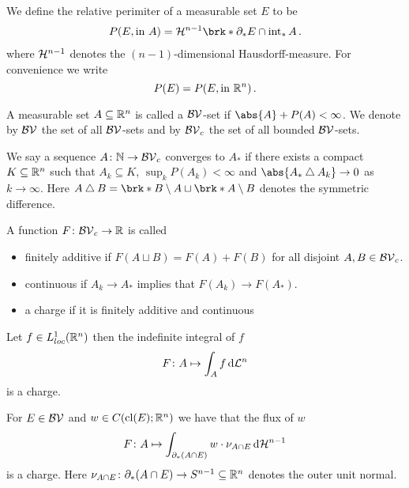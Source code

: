 \begin{frame}
	\begin{definition}
	We define the relative perimiter of a measurable set $E$ to be 
	\begin{align*}
		P(E,\text{in }A)=\cH^{n-1}\brk*{\partial_*E\cap \interiour_*A}\,.
	\end{align*}
	where $\mathcal{H}^{n-1}$ denotes the $(n-1)$-dimensional Hausdorff-measure. For convenience we write $$P(E)=P(E,\text{in }\mathbb{R}^n)\,.$$
	\end{definition}
\end{frame}

\begin{frame}
	\begin{definition}[$\BV$-sets]
	A measurable set $A\subseteq\mathbb{R}^n$ is called a $\BV$-set if $ \abs{A}+P(A)<\infty$. We denote by $\BV$ the set of all $\BV$-sets and by $\BV_c$ the set of all bounded $\BV$-sets.
	\end{definition}
	\begin{definition}[Topology on $\BV_c$]
	We say a sequence $A\colon\mathbb{N}\to \mathcal{BV}_c$ converges to $A_*$ if there exists a compact $K\subseteq\mathbb{R}^n$ such that $A_k\subseteq K$, $\sup_kP(A_k)<\infty$ and $\abs{A_*\symmDiff A_k}\to0$ as $k\to\infty$. Here $A\symmDiff B=\brk*{B\setminus A}\sqcup \brk*{A\setminus B}$ denotes the symmetric difference.
	\end{definition}
\end{frame}

\begin{frame}
	\begin{definition}[Charge]
	A function $F\colon \mathcal{BV}_c\to\mathbb{R}$ is called
	\begin{itemize}
		\item finitely additive if $F(A\sqcup B) =F(A)+F(B)$ for all disjoint $A,B\in\mathcal{BV}_c$.
		\item continuous if $A_k\to A_*$ implies that $F(A_k)\to F(A_*)$.
		\item a charge if it is finitely additive and continuous
	\end{itemize}
	\end{definition}
\end{frame}

\begin{frame}
	\begin{Example}
	Let $f\in L^1_{loc}(\mathbb{R}^n)$ then the indefinite integral of $f$
	\begin{align*}
		F\colon A\mapsto \int_Af\,\mathrm{d} \mathcal{L}^n
	\end{align*}
	is a charge.
	\end{Example}
	\begin{Example}
	For $E\in\mathcal{BV}$  and $w\in C(\operatorname{cl}(E);\mathbb{R}^n)$ we have that the flux of $w$
	\begin{align*}
		F\colon A\mapsto \int_{\partial_*(A\cap E)}w\cdot\nu_{A\cap E}\,\mathrm{d} \mathcal{H}^{n-1}
	\end{align*}
	is a charge. Here $\nu_{A\cap E}\colon \partial_*(A\cap E)\to S^{n-1}\subseteq\mathbb{R}^n$ denotes the outer unit normal.
	\end{Example}
\end{frame}

